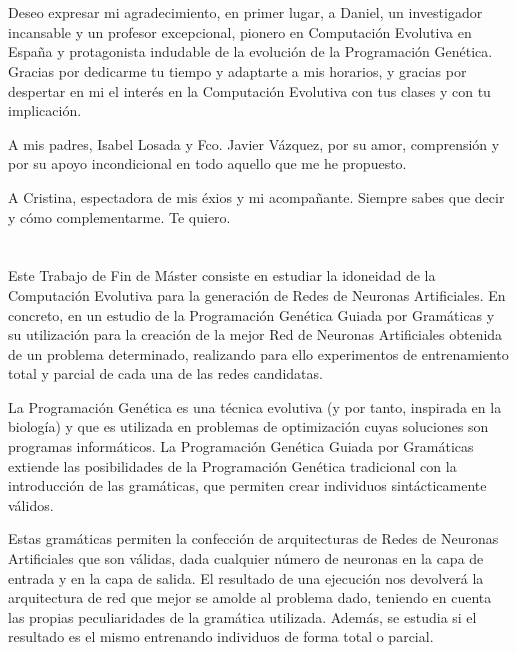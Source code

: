 \documentclass[spanish,a4paper,12pt,twoside]{report}
\begin{document}
  \chapter{\vspace{-3cm}{\LARGE Agradecimientos}}
  \vspace{-1cm}
    Deseo expresar mi agradecimiento, en primer lugar, a Daniel, un investigador incansable y un profesor excepcional, pionero en Computación Evolutiva en España y protagonista indudable de la evolución de la Programación Genética. Gracias por dedicarme tu tiempo y adaptarte a mis horarios, y gracias por despertar en mi el interés en la Computación Evolutiva con tus clases y con tu implicación.\par
    A mis padres, Isabel Losada y Fco. Javier Vázquez, por su amor, comprensión y por su apoyo incondicional en todo aquello que me he propuesto.\par
    A Cristina, espectadora de mis éxios y mi acompañante. Siempre sabes que decir y cómo complementarme. Te quiero.
  \vfill
  \newpage\cleardoublepage
  
  \chapter{\vspace{-3cm}{\LARGE Resumen}}
  \vspace{-1cm}
  Este Trabajo de Fin de Máster consiste en estudiar la idoneidad de la Computación Evolutiva para la generación de Redes de Neuronas Artificiales. En concreto, en un estudio de la Programación Genética Guiada por Gramáticas y su utilización para la creación de la mejor Red de Neuronas Artificiales obtenida de un problema determinado, realizando para ello experimentos de entrenamiento total y parcial de cada una de las redes candidatas. \par
  La Programación Genética es una técnica evolutiva (y por tanto, inspirada en la biología) y que es utilizada en problemas de optimización cuyas soluciones son programas informáticos. La Programación Genética Guiada por Gramáticas extiende las posibilidades de la Programación Genética tradicional con la introducción de las gramáticas, que permiten crear individuos sintácticamente válidos. \par
  Estas gramáticas permiten la confección de arquitecturas de Redes de Neuronas Artificiales que son válidas, dada cualquier número de neuronas en la capa de entrada y en la capa de salida. El resultado de una ejecución nos devolverá la arquitectura de red que mejor se amolde al problema dado, teniendo en cuenta las propias peculiaridades de la gramática utilizada. Además, se estudia si el resultado es el mismo entrenando individuos de forma total o parcial.
  \vfill
  \newpage\cleardoublepage
  
\end{document}
